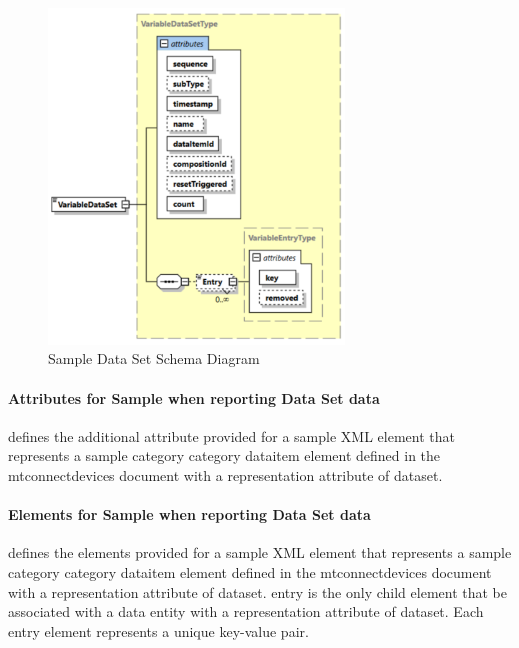 \begin{figure}[ht]
  \centering
  \includegraphics[width=0.7\textwidth]{figures/sample-data-set-schema-diagram.png}
  \caption{Sample Data Set Schema Diagram}
  \label{fig:sample-data-set-schema-diagram}
\end{figure}
\FloatBarrier

\paragraph{Attributes for Sample when reporting Data Set data}\mbox{}
\label{sec:Attributes for Sample when reporting Data Set data}

 defines the additional attribute provided for a \gls{sample} XML element that represents a \gls{sample category} category \gls{dataitem} element defined in the \gls{mtconnectdevices} document with a \gls{representation} attribute of \gls{dataset}.



\paragraph{Elements for Sample when reporting Data Set data}\mbox{}
\label{sec:Elements for Sample when reporting Data Set data}

 defines the elements provided for a \gls{sample} XML element that represents a \gls{sample category} category \gls{dataitem} element defined in the \gls{mtconnectdevices} document with a \gls{representation} attribute of \gls{dataset}. \gls{entry} is the only child element that \MAY be associated with a \gls{data entity} with a \gls{representation} attribute of \gls{dataset}. Each \gls{entry} element represents a unique \gls{key-value pair}. 

